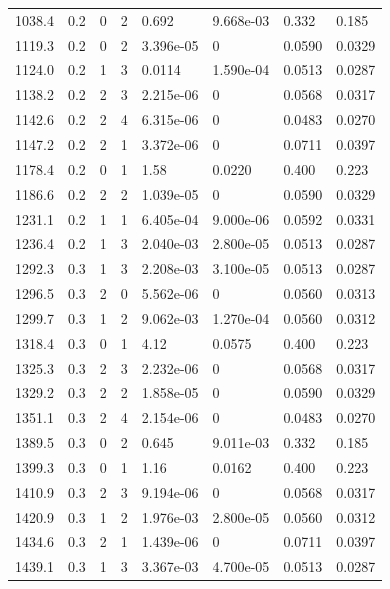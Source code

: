\documentclass[preview]{standalone}
\begin{document}
{{{\begin{tabular}{L{1.2cm}C{1.2cm} C{0.3cm}C{0.5cm} C{1.4cm}C{1.4cm} C{1.4cm}C{1.4cm}}
  1038.4  &   0.2  & 0     &  2 &  0.692  & 9.668e-03  & 0.332 &  0.185   \\ 
  1119.3  &   0.2  & 0     &  2 &  3.396e-05  & 0  & 0.0590 &  0.0329   \\ 
  1124.0  &   0.2  & 1     &  3 &  0.0114  & 1.590e-04  & 0.0513 &  0.0287   \\ 
  1138.2  &   0.2  & 2     &  3 &  2.215e-06  & 0  & 0.0568 &  0.0317   \\ 
  1142.6  &   0.2  & 2     &  4 &  6.315e-06  & 0  & 0.0483 &  0.0270   \\ 
  1147.2  &   0.2  & 2     &  1 &  3.372e-06  & 0  & 0.0711 &  0.0397   \\ 
  1178.4  &   0.2  & 0     &  1 &  1.58  & 0.0220  & 0.400 &  0.223   \\ 
  1186.6  &   0.2  & 2     &  2 &  1.039e-05  & 0  & 0.0590 &  0.0329   \\ 
  1231.1  &   0.2  & 1     &  1 &  6.405e-04  & 9.000e-06  & 0.0592 &  0.0331   \\ 
  1236.4  &   0.2  & 1     &  3 &  2.040e-03  & 2.800e-05  & 0.0513 &  0.0287   \\ 
  1292.3  &   0.3  & 1     &  3 &  2.208e-03  & 3.100e-05  & 0.0513 &  0.0287   \\ 
  1296.5  &   0.3  & 2     &  0 &  5.562e-06  & 0  & 0.0560 &  0.0313   \\ 
  1299.7  &   0.3  & 1     &  2 &  9.062e-03  & 1.270e-04  & 0.0560 &  0.0312   \\ 
  1318.4  &   0.3  & 0     &  1 &  4.12  & 0.0575  & 0.400 &  0.223   \\ 
  1325.3  &   0.3  & 2     &  3 &  2.232e-06  & 0  & 0.0568 &  0.0317   \\ 
  1329.2  &   0.3  & 2     &  2 &  1.858e-05  & 0  & 0.0590 &  0.0329   \\ 
  1351.1  &   0.3  & 2     &  4 &  2.154e-06  & 0  & 0.0483 &  0.0270   \\ 
  1389.5  &   0.3  & 0     &  2 &  0.645  & 9.011e-03  & 0.332 &  0.185   \\ 
  1399.3  &   0.3  & 0     &  1 &  1.16  & 0.0162  & 0.400 &  0.223   \\ 
  1410.9  &   0.3  & 2     &  3 &  9.194e-06  & 0  & 0.0568 &  0.0317   \\ 
  1420.9  &   0.3  & 1     &  2 &  1.976e-03  & 2.800e-05  & 0.0560 &  0.0312   \\ 
  1434.6  &   0.3  & 2     &  1 &  1.439e-06  & 0  & 0.0711 &  0.0397   \\ 
  1439.1  &   0.3  & 1     &  3 &  3.367e-03  & 4.700e-05  & 0.0513 &  0.0287   \\ 

\end{tabular}}}}
\end{document}
